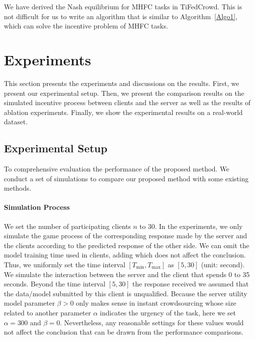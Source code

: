 \documentclass[final,1p,times]{elsarticle}
\begin{document}
We have derived the Nash equilibrium for MHFC tasks in TiFedCrowd. This is not difficult for us to write an algorithm that is similar to Algorithm~\ref{Algo1}, which can solve the incentive problem of MHFC tasks.

\section{Experiments} \label{sec:exp}
This section presents the experiments and discussions on the results. First, we present our experimental setup. Then, we present the comparison results on the simulated incentive process between clients and the server as well as the results of ablation experiments. Finally, we show the experimental results on a real-world dataset.

\subsection{Experimental Setup}
To comprehensive evaluation the performance of the proposed method. We conduct a set of simulations to compare our proposed method with some existing methods.

\paragraph{\textbf{Simulation Process}}
We set the number of participating clients $n$ to 30. In the experiments, we only simulate the game process of the corresponding response made by the server and the clients according to the predicted response of the other side. We can omit the model training time used in clients, adding which does not affect the conclusion. Thus, we uniformly set the time interval $[T_{\min},T_{\max}]$ as $[5,30]$ (unit: second). We simulate the interaction between the server and the client that spends 0 to 35 seconds. Beyond the time interval $[5,30]$ the response received we assumed that the data/model submitted by this client is unqualified. Because the server utility model parameter $\beta>0$ only makes sense in instant crowdsourcing whose size related to another parameter $\alpha$ indicates the urgency of the task, here we set $\alpha=300$ and $\beta=0$. Nevertheless, any reasonable settings for these values would not affect the conclusion that can be drawn from the performance comparisons.
\end{document}

